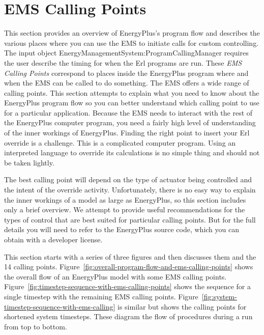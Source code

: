 \chapter{EMS Calling Points}\label{ems-calling-points}

This section provides an overview of EnergyPlus's program flow and describes the various places where you can use the EMS to initiate calls for custom controlling. The input object EnergyManagementSystem:ProgramCallingManager requires the user describe the timing for when the Erl programs are run. These \emph{EMS Calling Points} correspond to places inside the EnergyPlus program where and when the EMS can be called to do something. The EMS offers a wide range of calling points. This section attempts to explain what you need to know about the EnergyPlus program flow so you can better understand which calling point to use for a particular application. Because the EMS needs to interact with the rest of the EnergyPlus computer program, you need a fairly high level of understanding of the inner workings of EnergyPlus. Finding the right point to insert your Erl override is a challenge. This is a complicated computer program. Using an interpreted language to override its calculations is no simple thing and should not be taken lightly.

The best calling point will depend on the type of actuator being controlled and the intent of the override activity. Unfortunately, there is no easy way to explain the inner workings of a model as large as EnergyPlus, so this section includes only a brief overview. We attempt to provide useful recommendations for the types of control that are best suited for particular calling points. But for the full details you will need to refer to the EnergyPlus source code, which you can obtain with a developer license.

This section starts with a series of three figures and then discusses them and the 14 calling points. Figure~\ref{fig:overall-program-flow-and-ems-calling-points} shows the overall flow of an EnergyPlus model with some EMS calling points. Figure~\ref{fig:timestep-sequence-with-ems-calling-points} shows the sequence for a single timestep with the remaining EMS calling points. Figure~\ref{fig:system-timestep-sequence-with-ems-calling} is similar but shows the calling points for shortened system timesteps. These diagram the flow of procedures during a run from top to bottom.

